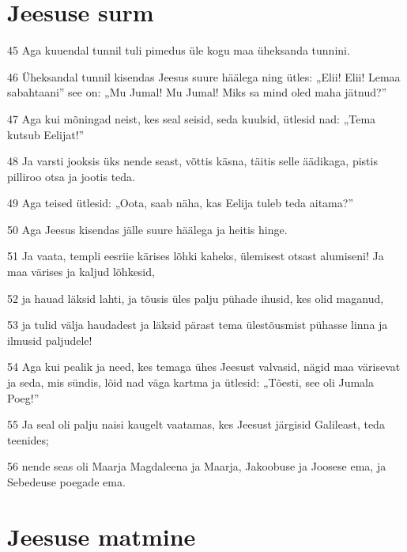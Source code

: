 \section*{Jeesuse surm}

\par 45 Aga kuuendal tunnil tuli pimedus üle kogu maa üheksanda tunnini.
\par 46 Üheksandal tunnil kisendas Jeesus suure häälega ning ütles: „Elii! Elii! Lemaa sabahtaani” see on: „Mu Jumal! Mu Jumal! Miks sa mind oled maha jätnud?”
\par 47 Aga kui mõningad neist, kes seal seisid, seda kuulsid, ütlesid nad: „Tema kutsub Eelijat!”
\par 48 Ja varsti jooksis üks nende seast, võttis käsna, täitis selle äädikaga, pistis pilliroo otsa ja jootis teda.
\par 49 Aga teised ütlesid: „Oota, saab näha, kas Eelija tuleb teda aitama?”
\par 50 Aga Jeesus kisendas jälle suure häälega ja heitis hinge.
\par 51 Ja vaata, templi eesriie kärises lõhki kaheks, ülemisest otsast alumiseni! Ja maa värises ja kaljud lõhkesid,
\par 52 ja hauad läksid lahti, ja tõusis üles palju pühade ihusid, kes olid maganud,
\par 53 ja tulid välja haudadest ja läksid pärast tema ülestõusmist pühasse linna ja ilmusid paljudele!
\par 54 Aga kui pealik ja need, kes temaga ühes Jeesust valvasid, nägid maa värisevat ja seda, mis sündis, lõid nad väga kartma ja ütlesid: „Tõesti, see oli Jumala Poeg!”
\par 55 Ja seal oli palju naisi kaugelt vaatamas, kes Jeesust järgisid Galileast, teda teenides;
\par 56 nende seas oli Maarja Magdaleena ja Maarja, Jakoobuse ja Joosese ema, ja Sebedeuse poegade ema.

\section*{Jeesuse matmine}

